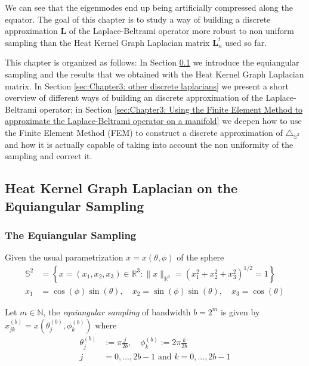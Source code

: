 We can see that the eigenmodes end up being artificially compressed along the equator.
The goal of this chapter is to study a way of building a discrete approximation $\mathbf L$ of the Laplace-Beltrami operator more robust to non uniform sampling than the Heat Kernel Graph Laplacian matrix $\mathbf L_n^t$ used so far.

This chapter is organized as follows: In Section \ref{sec:Chapter3: Heat Kernel Graph Laplacian on the Equiangular Sampling} we introduce the equiangular sampling and the results that we obtained with the Heat Kernel Graph Laplacian matrix. In Section \ref{sec:Chapter3: other discrete laplacians} we present a short overview of different ways of building an discrete approximation of the Laplace-Beltrami operator; in Section \ref{sec:Chapter3: Using the Finite Element Method to approximate the Laplace-Beltrami operator on a manifold} we deepen how to use the Finite Element Method (FEM) to construct a discrete approximation of $\triangle_{\mathbb S^2}$ and how it is actually capable of taking into account the non uniformity of the sampling and correct it.
\subsection{Heat Kernel Graph Laplacian on the Equiangular Sampling}
\label{sec:Chapter3: Heat Kernel Graph Laplacian on the Equiangular Sampling}

\subsubsection{The Equiangular Sampling}

Given the usual parametrization $x = x(\theta, \phi)$ of the sphere
\begin{align*}
	\mathbb{S}^{2}&=\left\{x=\left(x_{1}, x_{2}, x_{3}\right) \in \mathbb{R}^{3} :\|x\|_{\mathbb{R}^{3}}=\left(x_{1}^{2}+x_{2}^{2}+x_{3}^{2}\right)^{1 / 2}=1\right\}\\
	x_{1}&=\cos (\phi) \sin (\theta), \quad x_{2}=\sin (\phi) \sin (\theta), \quad x_{3}=\cos (\theta)
\end{align*}

Let $m\in\mathbb N$, the \textit{equiangular sampling} of bandwidth $b=2^m$ is given by 
$
x_{j k}^{(b)}=x\left(\theta_{j}^{(b)}, \phi_{k}^{(b)}\right)
$
where
\begin{align*}
	\theta_{j}^{(b)} &:=\pi \frac{j}{2 b}, \quad \phi_{k}^{(b)} :=2 \pi \frac{k}{2 b}\\
	j&=0, ..., 2b-1 \text{ and }k=0, ..., 2b-1 
\end{align*}

